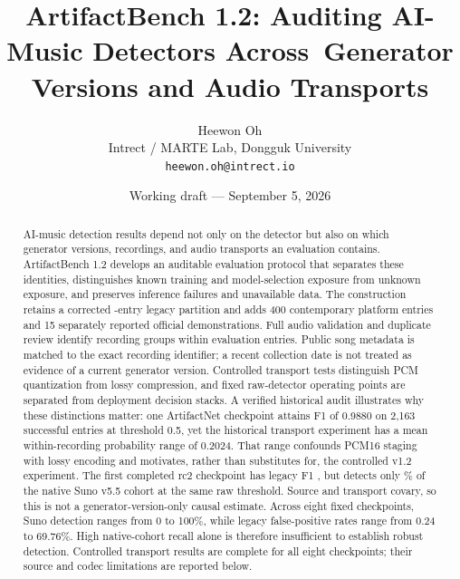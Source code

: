 \documentclass[10pt,a4paper]{article}
\title{ArtifactBench 1.2: Auditing AI-Music Detectors Across\ Generator Versions and Audio Transports}
\author{Heewon Oh\\Intrect / MARTE Lab, Dongguk University\\\texttt{heewon.oh@intrect.io}}
\date{Working draft --- September 5, 2026}
\begin{document}
\maketitle
\begin{center}
\end{center}

\begin{abstract}
AI-music detection results depend not only on the detector but also on which
generator versions, recordings, and audio transports an evaluation contains.
ArtifactBench 1.2 develops an auditable evaluation protocol that separates these
identities, distinguishes known training and model-selection exposure from
unknown exposure, and preserves inference failures and unavailable data.
The construction retains a corrected \LegacyEntries-entry legacy partition and adds
400 contemporary platform entries and 15 separately reported official demonstrations.
Full audio validation and duplicate review identify \RecordingGroups{} recording groups
within \BenchEntries{} evaluation entries. Public song metadata is matched to the exact recording
identifier; a recent collection date is not treated as evidence of a current
generator version. Controlled transport tests distinguish PCM quantization from
lossy compression, and fixed raw-detector operating points are separated from
deployment decision stacks. A verified historical audit illustrates why these
distinctions matter: one ArtifactNet checkpoint attains F1 of 0.9880 on 2,163
successful entries at threshold 0.5, yet the historical transport experiment
has a mean within-recording probability range of 0.2024. That range confounds
PCM16 staging with lossy encoding and motivates, rather than substitutes for,
the controlled v1.2 experiment. The first completed rc2 checkpoint has legacy
F1 \CheckpointLegacyFone{}, but detects only \CheckpointSunoRawTpr{}\% of the
native Suno v5.5 cohort at the same raw threshold. Source and transport covary,
so this is not a generator-version-only causal estimate. Across eight fixed
checkpoints, Suno detection ranges from 0 to 100\%, while legacy false-positive
rates range from 0.24 to 69.76\%. High native-cohort recall alone is therefore
insufficient to establish robust detection. Controlled transport results are
complete for all eight checkpoints; their source and codec limitations are
reported below.
\end{abstract}
\end{document}
